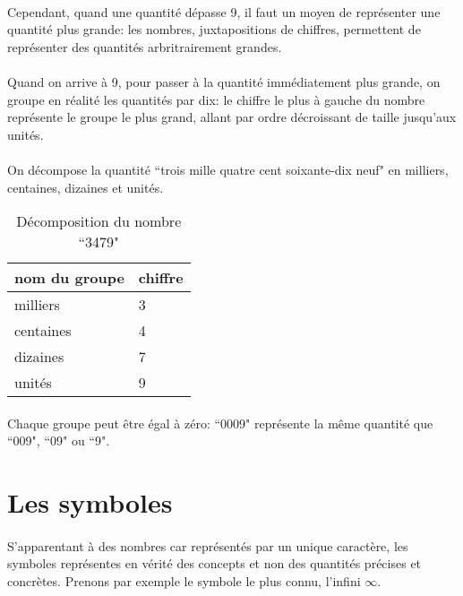 \documentclass[a4paper]{book}
\begin{document}
    \paragraph{}
    Cependant, quand une quantité dépasse 9, il faut un moyen de représenter une quantité plus grande: les nombres, juxtapositions de chiffres, permettent de représenter des quantités arbritrairement grandes.
    \paragraph{}
    Quand on arrive à 9, pour passer à la quantité immédiatement plus grande, on groupe en réalité les quantités par dix: le chiffre le plus à gauche du nombre représente le groupe le plus grand, allant par ordre décroissant de taille jusqu'aux unités.
    \paragraph{}
    On décompose la quantité ``trois mille quatre cent soixante-dix neuf" en milliers, centaines, dizaines et unités.
    \begin{table}[h]
        \centering
        \begin{tabular}{l|l}
            nom du groupe & chiffre\\\hline
            milliers & 3 \\
            centaines & 4 \\
            dizaines & 7\\
            unités & 9\\
        \end{tabular}
        \caption{Décomposition du nombre ``3479"}
        \label{tab:number_decomposition}
    \end{table}
    
    \paragraph{}
    Chaque groupe peut être égal à zéro: ``0009" représente la même quantité que ``009", ``09" ou ``9".
    
    \section{Les symboles}
    \paragraph{}
    S'apparentant à des nombres car représentés par un unique caractère, les symboles représentes en vérité des concepts et non des quantités précises et concrètes. Prenons par exemple le symbole le plus connu, l'infini $\infty$.
\end{document}
